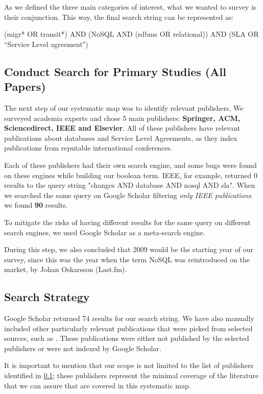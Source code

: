 \documentclass{article}
\begin{document}
As we defined the three main categories of interest, what we wanted to survey is their conjunction. This way, the final search string can be represented as: 

\begin{center}
(migr* OR transit*) AND (NoSQL AND (rdbms OR relational)) AND (SLA OR ``Service Level agreement") 
\end{center}

\subsection{Conduct Search for Primary Studies (All Papers)}\label{sec:allPapers}

The next step of our systematic map was to identify relevant publishers. We surveyed academia experts and chose 5 main publishers: \textbf{Springer, ACM, Sciencedirect, IEEE and Elsevier}. All of these publishers have relevant publications about databases and Service Level Agreements, as they index publications from reputable international conferences.  

Each of these publishers had their own search engine, and some bugs were found on these engines while building our boolean term. IEEE, for example, returned 0 results to the query string "changes AND database AND nosql AND sla". When we searched the same query on Google Scholar filtering \textit{only IEEE publications} we found \textbf{90} results.   

To mitigate the risks of having different results for the same query on different search engines, we used Google Scholar as a meta-search engine. 

During this step, we also concluded that 2009 would be the starting year of our survey, since this was the year when the term NoSQL was reintroduced on the market, by Johan Oskarsson (Last.fm)\cite{ericevans}.

\subsection{Search Strategy}\label{sec:searchStrategy}

Google Scholar returned 74 results for our search string. We have also manually included other particularly relevant publications that were picked from selected sources, such as \cite{mastersthesrilinda}. These publications were either not published by the selected publishers or were not indexed by Google Scholar. 

It is important to mention that our scope is not limited to the list of publishers identified in \ref{sec:allPapers}; these publishers represent the minimal coverage of the literature that we can assure that are covered in this systematic map.
\end{document}
